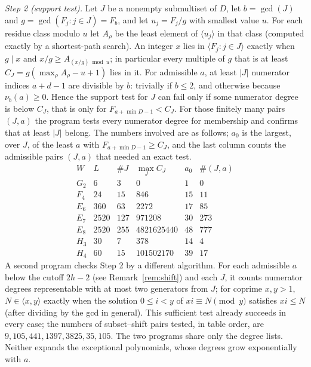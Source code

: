 \documentclass[11pt,a4paper]{article}
\theoremstyle{definition}\newtheorem{definition}[theorem]{Definition}
\theoremstyle{remark}\newtheorem{remark}[theorem]{Remark}\newtheorem{example}[theorem]{Example}
\numberwithin{equation}{section}
\begin{document}
\emph{Step 2 (support test).} Let $J$ be a nonempty submultiset of $D$, let $b=\gcd(J)$ and $g=\gcd(F_j:j\in J)=F_b$, and let $u_j=F_j/g$ with smallest value $u$. For each residue class modulo $u$ let $A_\rho$ be the least element of $\langle u_j\rangle$ in that class (computed exactly by a shortest-path search). An integer $x$ lies in $\langle F_j:j\in J\rangle$ exactly when $g\mid x$ and $x/g\ge A_{(x/g)\bmod u}$; in particular every multiple of $g$ that is at least $C_J=g(\max_\rho A_\rho-u+1)$ lies in it. For admissible $a$, at least $|J|$ numerator indices $a+d-1$ are divisible by $b$: trivially if $b\le2$, and otherwise because $\nu_b(a)\ge0$. Hence the support test for $J$ can fail only if some numerator degree is below $C_J$, that is only for $F_{a+\min D-1}<C_J$. For those finitely many pairs $(J,a)$ the program tests every numerator degree for membership and confirms that at least $|J|$ belong. The numbers involved are as follows; $a_0$ is the largest, over $J$, of the least $a$ with $F_{a+\min D-1}\ge C_J$, and the last column counts the admissible pairs $(J,a)$ that needed an exact test.
\[
\begin{array}{c|r|r|r|r|r}
 W&L&\#J&\max_J C_J&a_0&\#(J,a)\\\hline
 G_2&6&3&0&1&0\\
 F_4&24&15&846&15&11\\
 E_6&360&63&2272&17&85\\
 E_7&2520&127&971208&30&273\\
 E_8&2520&255&4821625440&48&777\\
 H_3&30&7&378&14&4\\
 H_4&60&15&101502170&39&17
\end{array}
\]
A second program checks Step 2 by a different algorithm. For each admissible $a$ below the cutoff $2h-2$ (see Remark~\ref{rem:shift}) and each $J$, it counts numerator degrees representable with at most two generators from $J$; for coprime $x,y>1$, $N\in\langle x,y\rangle$ exactly when the solution $0\le i<y$ of $xi\equiv N\pmod y$ satisfies $xi\le N$ (after dividing by the gcd in general). This sufficient test already succeeds in every case; the numbers of subset--shift pairs tested, in table order, are $9,105,441,1397,3825,35,105$. The two programs share only the degree lists. Neither expands the exceptional polynomials, whose degrees grow exponentially with $a$.
\end{document}
